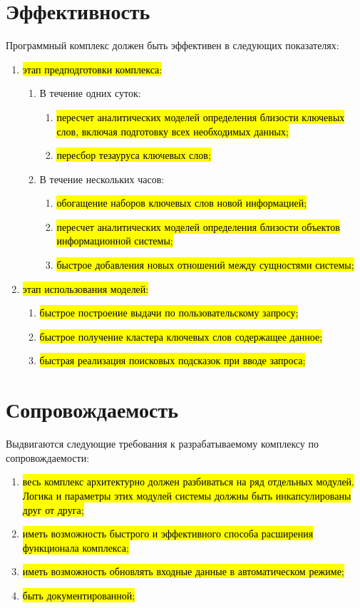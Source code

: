 \section{Эффективность}
Программный комплекс должен быть эффективен в следующих показателях:
\begin{enumerate}
    \item  \hl{этап предподготовки комплекса:}
        \begin{enumerate}
            \item В течение одних суток:
            \begin{enumerate}
                \item \hl{пересчет аналитических моделей определения близости ключевых слов, включая подготовку всех необходимых данных;}
                \item \hl{пересбор тезауруса ключевых слов;}
            \end{enumerate}
            \item В течение нескольких часов:
            \begin{enumerate}
                \item \hl{обогащение наборов ключевых слов новой информацией;}
                \item \hl{пересчет аналитических моделей определения близости объектов информационной системы;}
                \item \hl{быстрое добавления новых отношений между сущностями системы;}
            \end{enumerate}
        \end{enumerate}
    \item  \hl{этап использования моделей:}
        \begin{enumerate}
            \item  \hl{быстрое построение выдачи по пользовательскому запросу;}
            \item  \hl{быстрое получение кластера ключевых слов содержащее данное;}
            \item  \hl{быстрая реализация поисковых подсказок при вводе запроса;}
        \end{enumerate}
\end{enumerate}
\section{Сопровождаемость}
Выдвигаются следующие требования к разрабатываемому комплексу по сопровождаемости:
\begin{enumerate}
    \item  \hl{весь комплекс архитектурно должен разбиваться на ряд отдельных модулей. Логика и параметры этих модулей системы должны быть инкапсулированы друг от друга;}
    \item  \hl{иметь возможность быстрого и эффективного способа расширения функционала комплекса;}
    \item  \hl{иметь возможность обновлять входные данные в автоматическом режиме;}
    \item  \hl{быть документированной;}
\end{enumerate}
